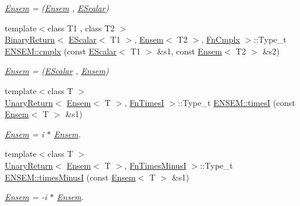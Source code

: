 \begin{DoxyCompactItemize}
\begin{DoxyCompactList}\small\item\em \mbox{\hyperlink{classENSEM_1_1Ensem}{Ensem}} = (\mbox{\hyperlink{classENSEM_1_1Ensem}{Ensem}} , \mbox{\hyperlink{classENSEM_1_1EScalar}{E\+Scalar}}) \end{DoxyCompactList}\item 
{\footnotesize template$<$class T1 , class T2 $>$ }\\\mbox{\hyperlink{structENSEM_1_1BinaryReturn}{Binary\+Return}}$<$ \mbox{\hyperlink{classENSEM_1_1EScalar}{E\+Scalar}}$<$ T1 $>$, \mbox{\hyperlink{classENSEM_1_1Ensem}{Ensem}}$<$ T2 $>$, \mbox{\hyperlink{structENSEM_1_1FnCmplx}{Fn\+Cmplx}} $>$\+::Type\+\_\+t \mbox{\hyperlink{group__eensem_gae141b1babc25cfea8bcda2218aea5125}{E\+N\+S\+E\+M\+::cmplx}} (const \mbox{\hyperlink{classENSEM_1_1EScalar}{E\+Scalar}}$<$ T1 $>$ \&s1, const \mbox{\hyperlink{classENSEM_1_1Ensem}{Ensem}}$<$ T2 $>$ \&s2)
\begin{DoxyCompactList}\small\item\em \mbox{\hyperlink{classENSEM_1_1Ensem}{Ensem}} = (\mbox{\hyperlink{classENSEM_1_1EScalar}{E\+Scalar}} , \mbox{\hyperlink{classENSEM_1_1Ensem}{Ensem}}) \end{DoxyCompactList}\item 
{\footnotesize template$<$class T $>$ }\\\mbox{\hyperlink{structENSEM_1_1UnaryReturn}{Unary\+Return}}$<$ \mbox{\hyperlink{classENSEM_1_1Ensem}{Ensem}}$<$ T $>$, \mbox{\hyperlink{structENSEM_1_1FnTimesI}{Fn\+TimesI}} $>$\+::Type\+\_\+t \mbox{\hyperlink{group__eensem_ga3fc5873019ba3366e2e3fd6cad8632bd}{E\+N\+S\+E\+M\+::timesI}} (const \mbox{\hyperlink{classENSEM_1_1Ensem}{Ensem}}$<$ T $>$ \&s1)
\begin{DoxyCompactList}\small\item\em \mbox{\hyperlink{classENSEM_1_1Ensem}{Ensem}} = i $\ast$ \mbox{\hyperlink{classENSEM_1_1Ensem}{Ensem}}. \end{DoxyCompactList}\item 
{\footnotesize template$<$class T $>$ }\\\mbox{\hyperlink{structENSEM_1_1UnaryReturn}{Unary\+Return}}$<$ \mbox{\hyperlink{classENSEM_1_1Ensem}{Ensem}}$<$ T $>$, \mbox{\hyperlink{structENSEM_1_1FnTimesMinusI}{Fn\+Times\+MinusI}} $>$\+::Type\+\_\+t \mbox{\hyperlink{group__eensem_ga405bf45509ebc2aed7e0bc4423e24849}{E\+N\+S\+E\+M\+::times\+MinusI}} (const \mbox{\hyperlink{classENSEM_1_1Ensem}{Ensem}}$<$ T $>$ \&s1)
\begin{DoxyCompactList}\small\item\em \mbox{\hyperlink{classENSEM_1_1Ensem}{Ensem}} = -\/i $\ast$ \mbox{\hyperlink{classENSEM_1_1Ensem}{Ensem}}. \end{DoxyCompactList}\item 

\end{DoxyCompactItemize}

